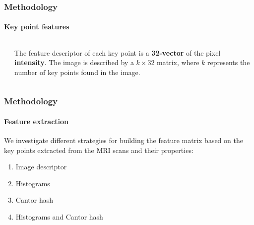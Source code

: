 \begin{frame}
	\frametitle{Methodology}
	\framesubtitle{Key point features}
	
	\Large
	
	\begin{columns}[T]
		
		\begin{center}
		\end{center}
		
		
		\vspace{0.65cm}
		
		The feature descriptor of each key point is a \textbf{32-vector} of the pixel
		\textbf{intensity}. The image is described by a $ k \times 32 $ matrix, where $ k $ represents
		the number of key points found in the image.
		
	\end{columns}
\end{frame}

\begin{frame}
	\frametitle{Methodology}
	\framesubtitle{Feature extraction}
	
	\Large
	
	\vspace{0.4cm}
	
	We investigate different strategies for building the feature matrix based on the key points
	extracted from the MRI scans and their properties:
	
	\begin{enumerate}
		\item Image descriptor
		\item Histograms
		\item Cantor hash
		\item Histograms and Cantor hash
	\end{enumerate}
\end{frame}

